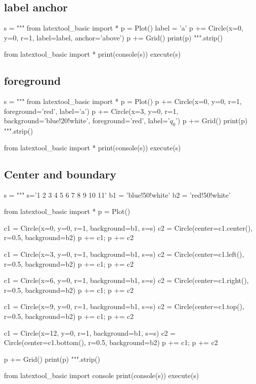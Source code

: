 \newpage
\subsection{label anchor}
\begin{python}
s = """
from latextool_basic import *
p = Plot()
label = 'a'
p += Circle(x=0, y=0, r=1, label=label, anchor='above')
p += Grid()
print(p)
""".strip()

from latextool_basic import *
print(console(s))
execute(s)
\end{python}




\newpage
\subsection{foreground}
\begin{python}
s = """
from latextool_basic import *
p = Plot()
p += Circle(x=0, y=0, r=1, foreground='red', label='a')
p += Circle(x=3, y=0, r=1, background='blue!20!white', 
                           foreground='red', label='$q_0$')
p += Grid()
print(p)
""".strip()

from latextool_basic import *
print(console(s))
execute(s)
\end{python}




\newpage
\subsection{Center and boundary}
\begin{python}
s = """
s='1 2 3 4 5 6 7 8 9 10 11'
b1 = 'blue!50!white'
b2 = 'red!50!white'

from latextool_basic import *
p = Plot()

c1 = Circle(x=0, y=0, r=1, background=b1, s=s)
c2 = Circle(center=c1.center(), r=0.5, background=b2)
p += c1; p += c2

c1 = Circle(x=3, y=0, r=1, background=b1, s=s)
c2 = Circle(center=c1.left(), r=0.5, background=b2)
p += c1; p += c2

c1 = Circle(x=6, y=0, r=1, background=b1, s=s)
c2 = Circle(center=c1.right(), r=0.5, background=b2)
p += c1; p += c2

c1 = Circle(x=9, y=0, r=1, background=b1, s=s)
c2 = Circle(center=c1.top(), r=0.5, background=b2)
p += c1; p += c2

c1 = Circle(x=12, y=0, r=1, background=b1, s=s)
c2 = Circle(center=c1.bottom(), r=0.5, background=b2)
p += c1; p += c2

p += Grid()
print(p)
""".strip()

from latextool_basic import console
print(console(s))
execute(s)
\end{python}





